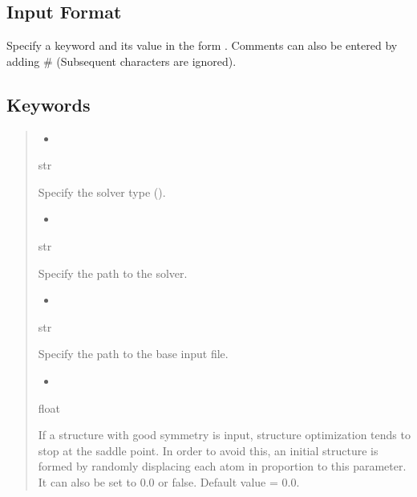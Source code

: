 \documentclass[letterpaper,10pt,english]{sphinxmanual}
\begin{document}
\subsection{Input Format}
\label{\detokenize{file_specification/parameter_solver:input-format}}
Specify a keyword and its value in the form .
Comments can also be entered by adding \# (Subsequent characters are ignored).


\subsection{Keywords}
\label{\detokenize{file_specification/parameter_solver:keywords}}\begin{quote}
\begin{itemize}
\item {} 

\end{itemize}

 str

Specify the solver type ().
\begin{itemize}
\item {} 

\end{itemize}

 str

Specify the path to the solver.
\begin{itemize}
\item {} 

\end{itemize}

 str

Specify the path to the base input file.
\begin{itemize}
\item {} 

\end{itemize}

 float

If a structure with good symmetry is input, structure optimization tends to stop at the saddle point. In order to avoid this, an initial structure is formed by randomly displacing each atom in proportion to this parameter. It can also be set to 0.0 or false. Default value = 0.0.
\end{quote}
\end{document}

